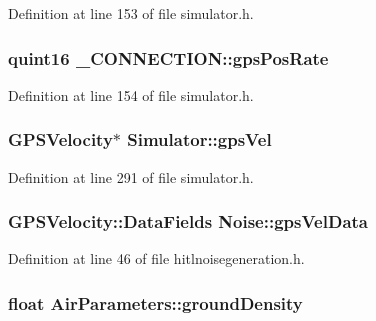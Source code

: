 \-Definition at line 153 of file simulator.\-h.

\hypertarget{group___h_i_t_l_plugin_ga2904afd635e416ec6fca4b3b6bb8679f}{
\subsubsection[{gps\-Pos\-Rate}]{\setlength{\rightskip}{0pt plus 5cm}quint16 {\bf \-\_\-\-C\-O\-N\-N\-E\-C\-T\-I\-O\-N\-::gps\-Pos\-Rate}}}\label{group___h_i_t_l_plugin_ga2904afd635e416ec6fca4b3b6bb8679f}


\-Definition at line 154 of file simulator.\-h.

\hypertarget{group___h_i_t_l_plugin_ga649eab8811fb3f1e6596e48eac2d47c7}{
\subsubsection[{gps\-Vel}]{\setlength{\rightskip}{0pt plus 5cm}\-G\-P\-S\-Velocity$\ast$ {\bf \-Simulator\-::gps\-Vel}}}\label{group___h_i_t_l_plugin_ga649eab8811fb3f1e6596e48eac2d47c7}


\-Definition at line 291 of file simulator.\-h.

\hypertarget{group___h_i_t_l_plugin_gafefa36e4fa6d8da826bbfcf9f604119c}{
\subsubsection[{gps\-Vel\-Data}]{\setlength{\rightskip}{0pt plus 5cm}\-G\-P\-S\-Velocity\-::\-Data\-Fields {\bf \-Noise\-::gps\-Vel\-Data}}}\label{group___h_i_t_l_plugin_gafefa36e4fa6d8da826bbfcf9f604119c}


\-Definition at line 46 of file hitlnoisegeneration.\-h.

\hypertarget{group___h_i_t_l_plugin_ga450ddae855377cbc0ce591c7703bcf3f}{
\subsubsection[{ground\-Density}]{\setlength{\rightskip}{0pt plus 5cm}float {\bf \-Air\-Parameters\-::ground\-Density}}}\label{group___h_i_t_l_plugin_ga450ddae855377cbc0ce591c7703bcf3f}


